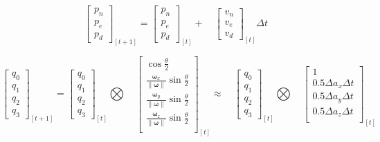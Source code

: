 \begin{equation}
        \left[\begin{array}{c}
            p_n  \\
            p_e  \\
            p_d
        \end{array}\right]_{[t+1]}=\left[\begin{array}{c}
            p_n  \\
            p_e  \\
            p_d
        \end{array}\right]_{[t]}+\quad\left[\begin{array}{c}
            v_n  \\
            v_e  \\
            v_d
        \end{array}\right]_{[t]}{\Delta t}
\end{equation}

\begin{equation}
        \left[\begin{array}{c}
            q_0  \\
            q_1  \\
            q_2  \\
            q_3
        \end{array}\right]_{[t+1]}=\left[\begin{array}{c}
            q_0  \\
            q_1  \\
            q_2  \\
            q_3
        \end{array}\right]_{[t]} \bigotimes\quad \left[\begin{array}{c}
            \cos{\frac{\theta}{2}}  \\
            \frac{\boldsymbol{\omega}_x}{\left\lVert\boldsymbol{\omega}\right\rVert} \sin \frac{\theta}{2}  \\
            \frac{\boldsymbol{\omega}_y}{\left\lVert\boldsymbol{\omega}\right\rVert} \sin \frac{\theta}{2}  \\
            \frac{\boldsymbol{\omega}_z}{\left\lVert\boldsymbol{\omega}\right\rVert} \sin \frac{\theta}{2}  \\
        \end{array}\right]_{[t]}\approx\quad \left[\begin{array}{c}
            q_0  \\
            q_1  \\
            q_2  \\
            q_3
        \end{array}\right]_{[t]}\bigotimes\quad \left[\begin{array}{c}
            1  \\
            0.5\Delta a_x\Delta t  \\
            0.5\Delta a_y\Delta t  \\
            0.5\Delta a_z\Delta t  \\
        \end{array}\right]_{[t]}
\end{equation}

